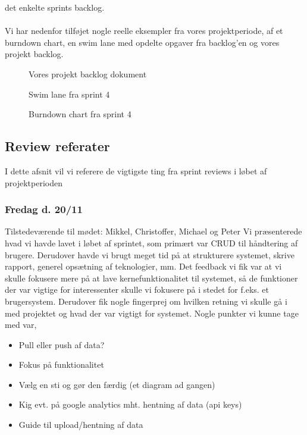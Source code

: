 det enkelte sprints backlog.
\\\\
Vi har nedenfor tilføjet nogle reelle eksempler fra vores projektperiode, af et burndown chart, en swim lane med opdelte opgaver fra backlog'en og vores projekt backlog.
\begin{figure}[here]
    \caption{Vores projekt backlog dokument}
    \label{fig:projekt-backlog}
\end{figure}
\begin{figure}[here]
    \caption{Swim lane fra sprint 4}
    \label{fig:swim-lane}
\end{figure}
\begin{figure}[here]
    \caption{Burndown chart fra sprint 4}
    \label{fig:burndown-chart}
\end{figure}
\subsection{Review referater}
I dette afsnit vil vi referere de vigtigste ting fra sprint reviews i løbet af projektperioden
\subsubsection{Fredag d. 20/11}
Tilstedeværende til mødet: Mikkel, Christoffer, Michael og Peter
Vi præsenterede hvad vi havde lavet i løbet af sprintet, som primært var CRUD til håndtering af brugere. Derudover havde vi brugt meget tid på at strukturere systemet, skrive rapport, generel opsætning af teknologier, mm.
Det feedback vi fik var at vi skulle fokusere mere på at lave kernefunktionalitet til systemet, så de funktioner der var vigtige for interessenter skulle vi fokusere på i stedet for f.eks. et brugersystem.
Derudover fik nogle fingerprej om hvilken retning vi skulle gå i med projektet og hvad der var vigtigt for systemet.
Nogle punkter vi kunne tage med var,
\begin{itemize}
    \item{Pull eller push af data?}
    \item{Fokus på funktionalitet}
    \item{Vælg en sti og gør den færdig (et diagram ad gangen)}
    \item{Kig evt. på google analytics mht. hentning af data (api keys)}
    \item{Guide til upload/hentning af data}
\end{itemize}
